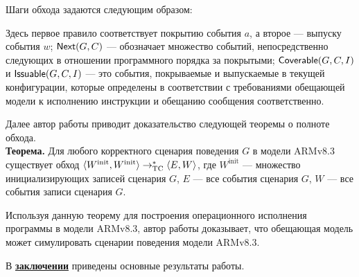 Шаги обхода задаются следующим образом:
Здесь первое правило соответствует покрытию события $a$, а второе --- выпуску события $w$; ${\sf Next}(G, C)$ --- обозначает множество событий,
непосредственно следующих в отношении программного порядка за покрытыми; ${\sf Coverable}(G, C, I)$ и ${\sf Issuable}(G, C, I)$ --- это
события, покрываемые и выпускаемые в текущей конфигурации, которые определены в соответствии с требованиями обещающей модели
к исполнению инструкции и обещанию сообщения соответственно.

Далее автор работы приводит доказательство следующей теоремы о полноте обхода. \\
\textbf{Теорема.} Для любого корректного сценария поведения $G$ в модели ARMv8.3 существует обход
${\langle{W^{\textrm{init}}, W^{\textrm{init}}}\rangle} \rightarrow_{\rm TC}^{*} {\langle{E, W}\rangle}$,
где $W^{\textrm{init}}$ --- множество инициализирующих записей сценария $G$, $E$ --- все события сценария $G$,
$W$ --- все события записи сценария $G$.

Используя данную теорему для построения операционного исполнения программы в модели ARMv8.3,
автор работы доказывает, что обещающая модель может симулировать сценарии поведения модели ARMv8.3.



В \underline{\textbf{заключении}} приведены основные результаты работы.



